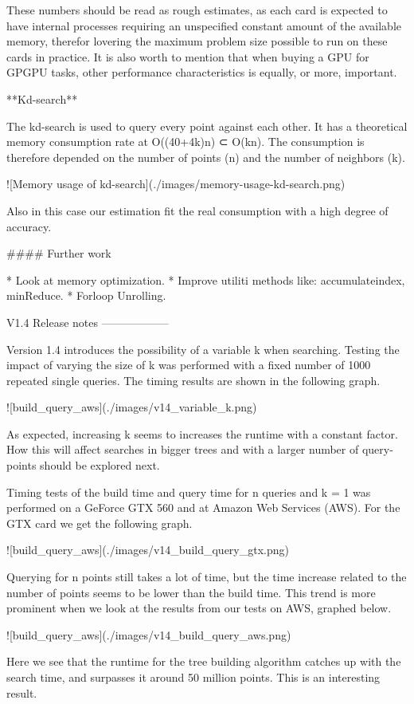 These numbers should be read as rough estimates, as each card is expected to have internal processes requiring an unspecified constant amount of the available memory, therefor lovering the maximum problem size possible to run on these cards in practice. It is also worth to mention that when buying a GPU for GPGPU tasks, other performance characteristics is equally, or more, important. 

**Kd-search**

The kd-search is used to query every point against each other. It has a theoretical memory consumption rate at O((40+4k)n) ⊂ O(kn). The consumption is therefore depended on the number of points (n) and the number of neighbors (k).

![Memory usage of kd-search](./images/memory-usage-kd-search.png)

Also in this case our estimation fit the real consumption with a high degree of accuracy.


#### Further work

* Look at memory optimization.
* Improve utiliti methods like: accumulateindex, minReduce.
* Forloop Unrolling.


V1.4 Release notes
------------------

Version 1.4 introduces the possibility of a variable k when searching. Testing the impact of varying the size of k was performed with a fixed number of 1000 repeated single queries. The timing results are shown in the following graph.

![build_query_aws](./images/v14_variable_k.png)

As expected, increasing k seems to increases the runtime with a constant factor. How this will affect searches in bigger trees and with a larger number of query-points should be explored next.

Timing tests of the build time and query time for n queries and k = 1 was performed on a GeForce GTX 560 and at Amazon Web Services (AWS). For the GTX card we get the following graph.

![build_query_aws](./images/v14_build_query_gtx.png)

Querying for n points still takes a lot of time, but the time increase related to the number of points seems to be lower than the build time. This trend is more prominent when we look at the results from our tests on AWS, graphed below.

![build_query_aws](./images/v14_build_query_aws.png)

Here we see that the runtime for the tree building algorithm catches up with the search time, and surpasses it around 50 million points. This is an interesting result.

